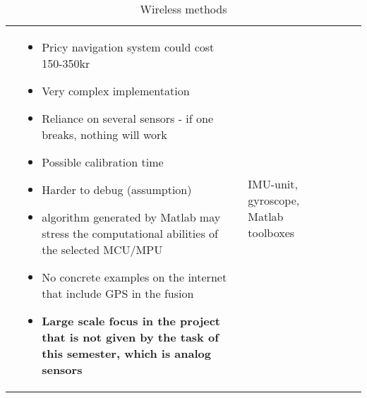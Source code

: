 \documentclass[../report.tex]{subfiles}
\begin{document}
\begin{table}[H]
\begin{tabularx}{\linewidth}{L|L|L|L|L}
\begin{itemize}
            \end{itemize}
            & 
            \begin{itemize}
                \item Pricy navigation system could cost 150-350kr
                \item Very complex implementation
                \item Reliance on several sensors - if one breaks, nothing will work
                \item Possible calibration time
                \item Harder to debug (assumption)
                \item algorithm generated by Matlab may stress the computational abilities of the selected MCU/MPU
                \item No concrete examples on the internet that include GPS in the fusion
                \item \textbf{Large scale focus in the project that is not given by the task of this semester, which is analog sensors}
            \end{itemize}
            & IMU-unit, gyroscope, Matlab toolboxes
            \\    
              
        \end{tabularx}
    \caption{Wireless methods}
    \label{tab:my_label}
    \end{table}
    
\end{document}
